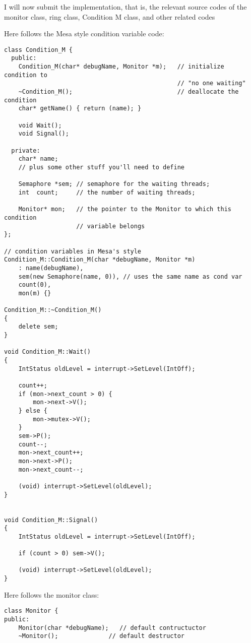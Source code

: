 \documentclass[11pt]{article}
\begin{document}
\begin{question}

    I will now submit the implementation, that is, the relevant source codes of the monitor class, ring class, Condition M class, and other related codes

    Here follows the Mesa style condition variable code:

    \begin{verbatim}
class Condition_M {
  public:
    Condition_M(char* debugName, Monitor *m);   // initialize condition to
                                                // "no one waiting"
    ~Condition_M();                             // deallocate the condition
    char* getName() { return (name); }

    void Wait();
    void Signal();

  private:
    char* name;
    // plus some other stuff you'll need to define

    Semaphore *sem; // semaphore for the waiting threads;
    int  count;     // the number of waiting threads;

    Monitor* mon;   // the pointer to the Monitor to which this condition
                    // variable belongs
};

// condition variables in Mesa's style
Condition_M::Condition_M(char *debugName, Monitor *m)
    : name(debugName),
    sem(new Semaphore(name, 0)), // uses the same name as cond var
    count(0),
    mon(m) {}

Condition_M::~Condition_M()
{
    delete sem;
}

void Condition_M::Wait()
{
    IntStatus oldLevel = interrupt->SetLevel(IntOff);

    count++;
    if (mon->next_count > 0) {
        mon->next->V();
    } else {
        mon->mutex->V();
    }
    sem->P();
    count--;
    mon->next_count++;
    mon->next->P();
    mon->next_count--;

    (void) interrupt->SetLevel(oldLevel);
}


void Condition_M::Signal()
{
    IntStatus oldLevel = interrupt->SetLevel(IntOff);

    if (count > 0) sem->V();

    (void) interrupt->SetLevel(oldLevel);
}
    \end{verbatim}

    Here follows the monitor class:

    \begin{verbatim}
class Monitor {
public:
    Monitor(char *debugName);   // default contructuctor
    ~Monitor();              // default destructor


\end{verbatim}
\end{question}
\end{document}
